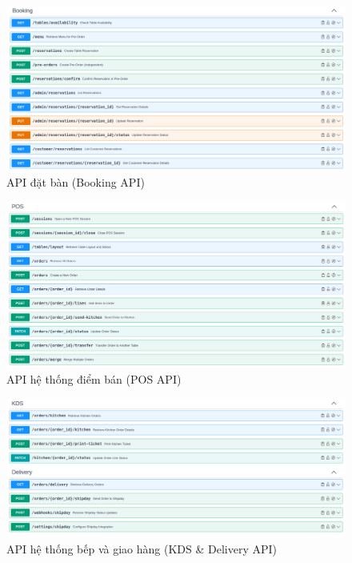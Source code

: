 \begin{figure}[H]
\centering
\includegraphics[width=15cm]{Images/Screenshot from 2025-05-10 17-03-52.png}
\vspace{0.5cm}
\caption{API đặt bàn (Booking API)}
\label{fig:api_booking}
\end{figure}

\begin{figure}[H]
\centering
\includegraphics[width=15cm]{Images/Screenshot from 2025-05-10 17-04-05.png}
\vspace{0.5cm}
\caption{API hệ thống điểm bán (POS API)}
\label{fig:api_pos}
\end{figure}

\begin{figure}[H]
\centering
\includegraphics[width=15cm]{Images/Screenshot from 2025-05-10 17-04-34.png}
\vspace{0.5cm}
\caption{API hệ thống bếp và giao hàng (KDS & Delivery API)}
\label{fig:api_kds_delivery}
\end{figure}

